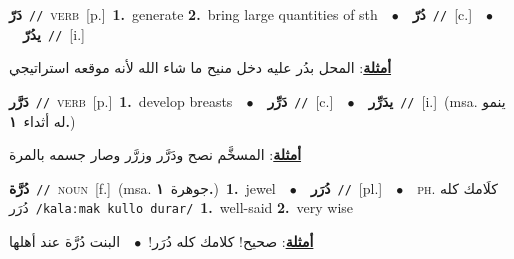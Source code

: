 \documentclass[10pt,a4paper,twoside]{article} %
\begin{document}
\begin{multicols}{2}
{\setlength\topsep{0pt}\textbf{\foreignlanguage{arabic}{دَرّ}}\ {\color{gray}\texttt{//}\color{black}}\ \textsc{verb}\ [p.]\ \textbf{1.}~generate  \textbf{2.}~bring large quantities of sth\ \ $\bullet$\ \ \setlength\topsep{0pt}\textbf{\foreignlanguage{arabic}{دُرّ}}\ {\color{gray}\texttt{//}\color{black}}\ [c.]\ \ $\bullet$\ \ \setlength\topsep{0pt}\textbf{\foreignlanguage{arabic}{يدُرّ}}\ {\color{gray}\texttt{//}\color{black}}\ [i.]\  \begin{flushright}\color{gray}\foreignlanguage{arabic}{\textbf{\underline{\foreignlanguage{arabic}{أمثلة}}}: المحل بدُر عليه دخل منيح ما شاء الله لأنه موقعه استراتيجي}\end{flushright}\color{black}} \vspace{2mm}

{\setlength\topsep{0pt}\textbf{\foreignlanguage{arabic}{دَرَّر}}\ {\color{gray}\texttt{//}\color{black}}\ \textsc{verb}\ [p.]\ \textbf{1.}~develop breasts\ \ $\bullet$\ \ \setlength\topsep{0pt}\textbf{\foreignlanguage{arabic}{دَرِّر}}\ {\color{gray}\texttt{//}\color{black}}\ [c.]\ \ $\bullet$\ \ \setlength\topsep{0pt}\textbf{\foreignlanguage{arabic}{يدَرِّر}}\ {\color{gray}\texttt{//}\color{black}}\ [i.]\ \color{gray}(msa. \foreignlanguage{arabic}{ينمو له أثداء}~\foreignlanguage{arabic}{\textbf{١.}})\color{black}\  \begin{flushright}\color{gray}\foreignlanguage{arabic}{\textbf{\underline{\foreignlanguage{arabic}{أمثلة}}}: المسخَّم نصح ودَرَّر وزرَّر وصار جسمه بالمرة}\end{flushright}\color{black}} \vspace{2mm}

{\setlength\topsep{0pt}\textbf{\foreignlanguage{arabic}{دُرَّة}}\ {\color{gray}\texttt{//}\color{black}}\ \textsc{noun}\ [f.]\ \color{gray}(msa. \foreignlanguage{arabic}{جوهرة}~\foreignlanguage{arabic}{\textbf{١.}})\color{black}\ \textbf{1.}~jewel\ \ $\bullet$\ \ \setlength\topsep{0pt}\textbf{\foreignlanguage{arabic}{دُرَر}}\ {\color{gray}\texttt{//}\color{black}}\ [pl.]\ \ $\bullet$\ \ \textsc{ph.} \color{gray} \foreignlanguage{arabic}{كلَامك كله دُرَر}\color{black}\ {\color{gray}\texttt{/{\sffamily kalaːmak kullo durar}/}\color{black}}\ \textbf{1.}~well-said  \textbf{2.}~very wise\  \begin{flushright}\color{gray}\foreignlanguage{arabic}{\textbf{\underline{\foreignlanguage{arabic}{أمثلة}}}: صحيح! كلامك كله دُرَر!\ $\bullet$\ \  البنت دُرَّة عند أهلها}\end{flushright}\color{black}} \vspace{2mm}


\end{multicols}
\end{document}
